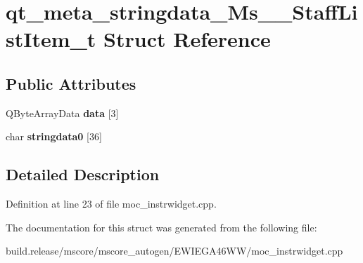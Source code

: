 \hypertarget{structqt__meta__stringdata___ms_____staff_list_item__t}{}\section{qt\+\_\+meta\+\_\+stringdata\+\_\+\+Ms\+\_\+\+\_\+\+Staff\+List\+Item\+\_\+t Struct Reference}
\label{structqt__meta__stringdata___ms_____staff_list_item__t}
\subsection*{Public Attributes}
\begin{DoxyCompactItemize}
\item 
\mbox{\label{structqt__meta__stringdata___ms_____staff_list_item__t_aaaa9e9a930ee0161b17ba95170a11c5c}} 
Q\+Byte\+Array\+Data {\bfseries data} \mbox{[}3\mbox{]}
\item 
\mbox{\label{structqt__meta__stringdata___ms_____staff_list_item__t_a2c6591536646b30f2566a00fae1aea0d}} 
char {\bfseries stringdata0} \mbox{[}36\mbox{]}
\end{DoxyCompactItemize}


\subsection{Detailed Description}


Definition at line 23 of file moc\+\_\+instrwidget.\+cpp.



The documentation for this struct was generated from the following file\+:\begin{DoxyCompactItemize}
\item 
build.\+release/mscore/mscore\+\_\+autogen/\+E\+W\+I\+E\+G\+A46\+W\+W/moc\+\_\+instrwidget.\+cpp\end{DoxyCompactItemize}
